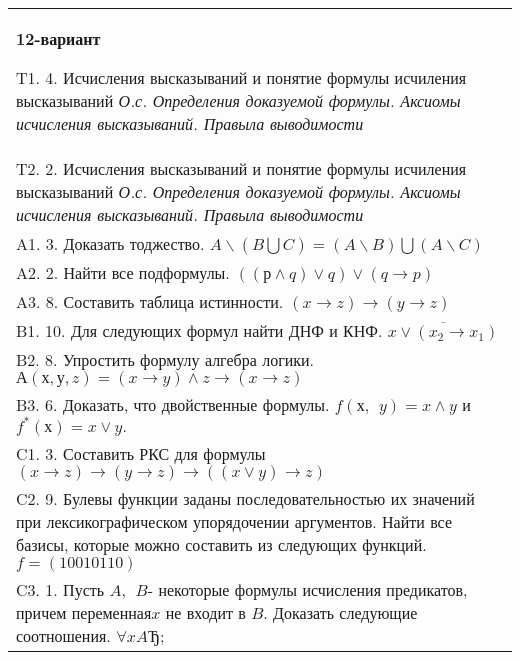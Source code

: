 \documentclass{article}
\begin{document}
\begin{tabular}{m{17cm}}
\textbf{12-вариант}
\newline

T1. 4. Исчисления высказываний и понятие формулы исчиления высказываний \emph{О.с. Определения доказуемой формулы. Аксиомы исчисления высказываний. Правыла выводимости} \\
T2. 2. Исчисления высказываний и понятие формулы исчиления высказываний \emph{О.с. Определения доказуемой формулы. Аксиомы исчисления высказываний. Правыла выводимости} \\
A1. 3. Доказать тоджество. \(A\backslash(B\bigcup C) = (A\backslash B)\bigcup(A\backslash C)\) \\
A2. 2. Найти все подформулы. \(\left( (р \land q) \vee q \right) \vee (q \rightarrow p)\) \\
A3. 8. Составить таблица истинности. \((x \rightarrow z) \rightarrow (y \rightarrow z)\) \\
B1. 10. Для следующих формул найти ДНФ и КНФ. \(\overline{x \vee (x_{2} \rightarrow x_{1})}\) \\
B2. 8. Упростить формулу алгебра логики. \(А(х,у,z) = (x \rightarrow y) \land z \rightarrow (x \rightarrow z)\) \\
B3. 6. Доказать, что двойственные формулы. \(f(х,\ \ y) = x \land y\) и \(f^{*}(х) = x \vee y.\) \\
C1. 3. Составить РКС для формулы \((x \rightarrow z) \rightarrow (y \rightarrow z) \rightarrow ((x \vee y) \rightarrow z)\) \\
C2. 9. Булевы функции заданы последовательностью их значений при лексикографическом упорядочении аргументов. Найти все базисы, которые можно составить из следующих функций. \(f = (10010110)\) \\
C3. 1. Пусть \(A,\ \ B\)- некоторые формулы исчисления предикатов, причем переменная\(x\) не входит в \(B\). Доказать следующие соотношения. \(\forall xAЂ\); \\

\end{tabular}
\vspace{1cm}
\end{document}
